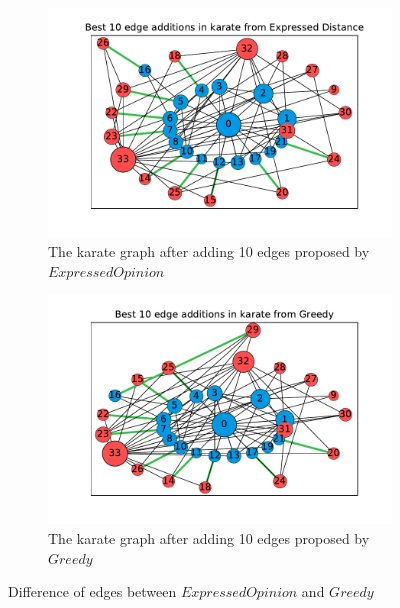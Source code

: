 \vspace{30pt}

\begin{figure}[!htbp]
	\centering
	\begin{subfigure}[t]{0.49\textwidth}
		\centering
		 \advance\leftskip-0.9cm
		 \captionsetup{justification=centering}
		\includegraphics[height=0.25\textheight]{Figures/karate_Expressed Distance_edge_vis}
		\caption{The karate graph after adding 10 edges proposed by $ExpressedOpinion$}
		\label{subfig:ge3}
	\end{subfigure}
	\hfill
	\begin{subfigure}[t]{0.49\textwidth}
		\centering
		\captionsetup{justification=centering}
		\includegraphics[height=0.25\textheight]{Figures/karate_Greedy_edge_vis}
		\caption{The karate graph after adding 10 edges proposed by $Greedy$}
		\label{subfig:g3}
	\end{subfigure}
	\vspace{20pt}
	\hfill
	\caption{Difference of edges between $ExpressedOpinion$ and $Greedy$}
	\label{fig:top-10-karate3}
\end{figure}


